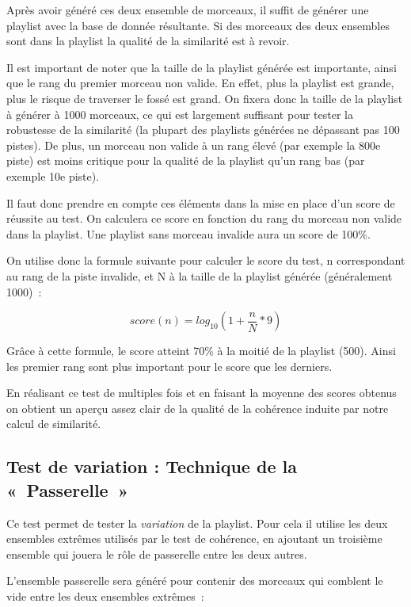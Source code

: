 Après avoir généré ces deux ensemble de morceaux, il suffit de générer une
playlist avec la base de donnée résultante. Si des morceaux des deux ensembles
sont dans la playlist la qualité de la similarité est à revoir.

Il est important de noter que la taille de la playlist générée est importante,
ainsi que le rang du premier morceau non valide. En effet, plus la playlist est
grande, plus le risque de traverser le fossé est grand. On fixera donc la taille
de la playlist à générer à 1000 morceaux, ce qui est largement suffisant pour
tester la robustesse de la similarité (la plupart des playlists générées ne
dépassant pas 100 pistes). De plus, un morceau non valide à un rang élevé (par
exemple la 800e piste) est moins critique pour la qualité de la playlist qu'un
rang bas (par exemple 10e piste).

Il faut donc prendre en compte ces éléments dans la mise en place d'un score de
réussite au test. On calculera ce score en fonction du rang du morceau non
valide dans la playlist. Une playlist sans morceau invalide aura un score de
100\%.

On utilise donc la formule suivante pour calculer le score du test, n
correspondant au rang de la piste invalide, et N à la taille de la playlist
générée (généralement 1000)~:

\begin{equation*}
  score(n) = log_{10}(1 + \frac{n}{N} * 9)
\end{equation*}

Grâce à cette formule, le score atteint 70\% à la moitié de la playlist (500).
Ainsi les premier rang sont plus important pour le score que les derniers.

En réalisant ce test de multiples fois et en faisant la moyenne des scores
obtenus on obtient un aperçu assez clair de la qualité de la cohérence induite
par notre calcul de similarité.

\subsection{Test de variation : Technique de la «~Passerelle~»}
\label{tests:qualite:variation-passerelle}

Ce test permet de tester la \emph{variation} de la playlist. Pour cela il
utilise les deux ensembles extrêmes utilisés par le test de cohérence, en 
ajoutant un troisième ensemble qui jouera le rôle de passerelle entre les
deux autres.

L'ensemble passerelle sera généré pour contenir des morceaux qui comblent le
vide entre les deux ensembles extrêmes~:

